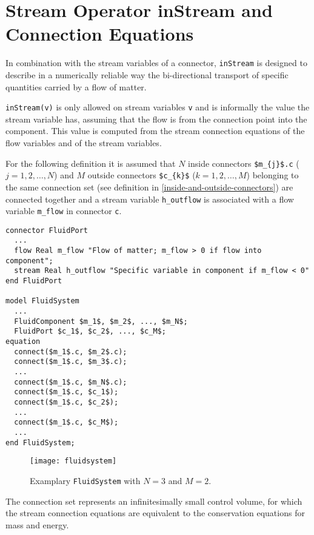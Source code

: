 \section{Stream Operator inStream and Connection Equations}\label{stream-operator-instream-and-connection-equations}

In combination with the stream variables of a connector, \lstinline!inStream! is designed to describe in a numerically
reliable way the bi-directional transport of specific quantities carried
by a flow of matter.

\lstinline!inStream(v)! is only allowed on stream variables \lstinline!v! and is
informally the value the stream variable has, assuming that the flow is
from the connection point into the component. This value is computed
from the stream connection equations of the flow variables and of the
stream variables.

For the following definition it is assumed that $N$ inside connectors
\lstinline!$m_{j}$.c! ($j = 1, 2, \ldots, N$) and $M$ outside connectors
\lstinline!$c_{k}$! ($k = 1, 2, \ldots, M$) belonging to the same connection set
(see definition in \cref{inside-and-outside-connectors}) are connected
together and a stream variable \lstinline!h_outflow! is associated with a flow
variable \lstinline!m_flow! in connector \lstinline!c!.

\begin{lstlisting}[language=modelica]
connector FluidPort
  ...
  flow Real m_flow "Flow of matter; m_flow > 0 if flow into component";
  stream Real h_outflow "Specific variable in component if m_flow < 0"
end FluidPort

model FluidSystem
  ...
  FluidComponent $m_1$, $m_2$, ..., $m_N$;
  FluidPort $c_1$, $c_2$, ..., $c_M$;
equation
  connect($m_1$.c, $m_2$.c);
  connect($m_1$.c, $m_3$.c);
  ...
  connect($m_1$.c, $m_N$.c);
  connect($m_1$.c, $c_1$);
  connect($m_1$.c, $c_2$);
  ...
  connect($m_1$.c, $c_M$);
  ...
end FluidSystem;
\end{lstlisting}
\begin{figure}[H]
  \begin{center}
    \texttt{[image: fluidsystem]}
  \end{center}
  \caption{Examplary \lstinline!FluidSystem! with $N = 3$ and $M = 2$.}
\end{figure}

\begin{nonnormative}
The connection set represents an infinitesimally small control
volume, for which the stream connection equations are equivalent to the
conservation equations for mass and energy.
\end{nonnormative}

